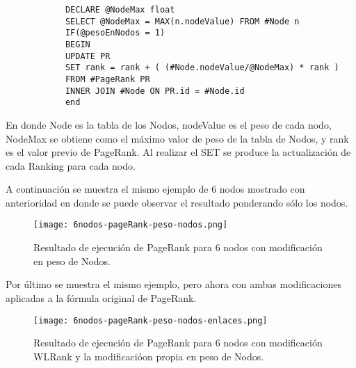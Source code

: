 	\tiny{
		\begin{verbatim}
			DECLARE @NodeMax float
			SELECT @NodeMax = MAX(n.nodeValue) FROM #Node n			
			IF(@pesoEnNodos = 1)
			BEGIN
			UPDATE PR 
			SET rank = rank + ( (#Node.nodeValue/@NodeMax) * rank )
			FROM #PageRank PR
			INNER JOIN #Node ON PR.id = #Node.id
			end
		\end{verbatim}
	}

En donde Node es la tabla de los Nodos, nodeValue es el peso de cada nodo, NodeMax se obtiene como el máximo valor de peso de la tabla de Nodos, y rank es el valor previo de PageRank. Al realizar el SET se produce la actualización de cada Ranking para cada nodo. 

A continuación se muestra el mismo ejemplo de 6 nodos mostrado con anterioridad en donde se puede observar el resultado ponderando sólo los nodos.

\begin{figure}
	\centering
	\texttt{[image: 6nodos-pageRank-peso-nodos.png]}
	\caption{Resultado de ejecución de PageRank para 6 nodos con modificación en peso de Nodos.} 
	\label{fig:6nodos-pageRank-peso-nodos}
\end{figure}

Por último se muestra el mismo ejemplo, pero ahora con ambas modificaciones aplicadas a la fórmula original de PageRank.

\begin{figure}
	\centering
	\texttt{[image: 6nodos-pageRank-peso-nodos-enlaces.png]}
	\caption{Resultado de ejecución de PageRank para 6 nodos con modificación WLRank y la modificacióon propia en peso de Nodos.} 
	\label{fig:6nodos-pageRank-peso-nodos-enlaces}
\end{figure}

